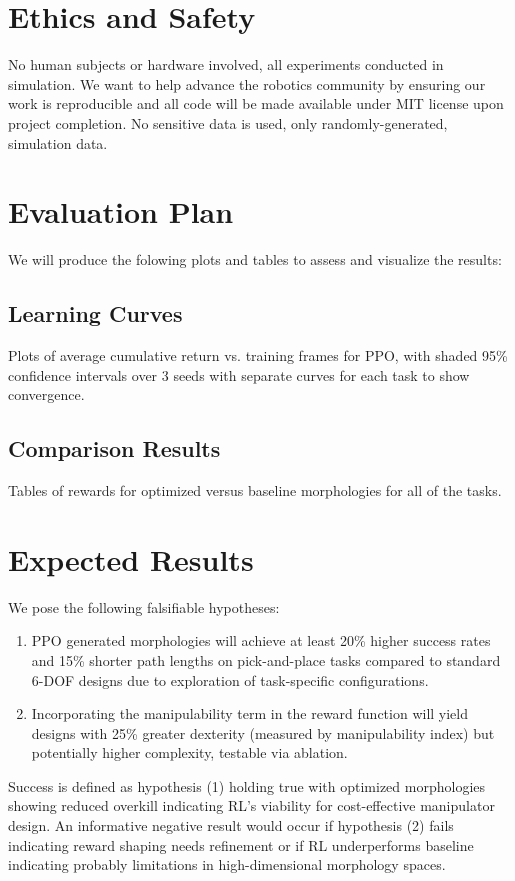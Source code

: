 \documentclass[conference]{IEEEtran}
\begin{document}
\section{Ethics and Safety}
No human subjects or hardware involved, all experiments conducted in simulation.
We want to help advance the robotics community by ensuring our work is reproducible and all code will be made available under MIT license upon project completion.
No sensitive data is used, only randomly-generated, simulation data.

\section{Evaluation Plan}
We will produce the folowing plots and tables to assess and visualize the results:

\subsection{Learning Curves}
Plots of average cumulative return vs. training frames for PPO, with shaded 95\% confidence intervals over 3 seeds with separate curves for each task to show convergence.

\subsection{Comparison Results}
Tables of rewards for optimized versus baseline morphologies for all of the tasks.

\section{Expected Results}
We pose the following falsifiable hypotheses:
\begin{enumerate}
    \item PPO generated morphologies will achieve at least 20\% higher success rates and 15\% shorter path lengths on pick-and-place tasks compared to standard 6-DOF designs due to exploration of task-specific configurations.
    \item Incorporating the manipulability term in the reward function will yield designs with 25\% greater dexterity (measured by manipulability index) but potentially higher complexity, testable via ablation.
\end{enumerate}

Success is defined as hypothesis (1) holding true with optimized morphologies showing reduced overkill indicating RL's viability for cost-effective manipulator design.
An informative negative result would occur if hypothesis (2) fails indicating reward shaping needs refinement or if RL underperforms baseline indicating probably limitations in high-dimensional morphology spaces.
\end{document}
